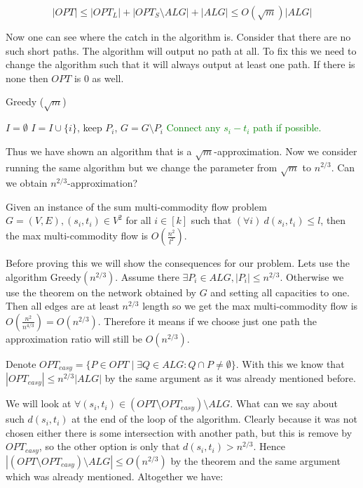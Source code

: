 $$
|OPT| \leq |OPT_{L}| + |OPT_{S} \setminus ALG| + |ALG| \leq O(\sqrt{m}) |ALG|
$$

Now one can see where the catch in the algorithm is. Consider that there are no such short paths. The algorithm will output no path at all. To fix this we need to change the algorithm such that it will always output at least one path. If there is none then $OPT$ is 0 as well.

\begin{algorithm}
	\caption{Greedy ($\sqrt{m}$)}
	\begin{algorithmic}[1]
		\State $I = \emptyset$
		\State $I = I \cup \{i\}$, keep $P_{i}$, $G = G \setminus P_{i}$
		\EndWhile
		\If{\textcolor{Green}{$I = \emptyset$}}
			\State \textcolor{Green}{Connect any $s_{i}-t_{i}$ path if possible.}
		\EndIf
	\end{algorithmic}
\end{algorithm}

Thus we have shown an algorithm that is a $\sqrt{m}$-approximation. Now we consider running the same algorithm but we change the parameter from $\sqrt{m}$ to $n^{2/3}$. Can we obtain $n^{2/3}$-approximation?

\begin{thm}
	\label{max flow bounded}
	Given an instance of the sum multi-commodity flow problem $G =(V,E), (s_{i}, t_{i}) \in V^2$ for all $i \in [k]$ such that $(\forall i) \ d(s_{i}, t_{i}) \leq l$, then the max multi-commodity flow is $O(\frac{n^2}{l^2})$.
\end{thm}

Before proving this we will show the consequences for our problem. Lets use the algorithm Greedy$(n^{2/3})$. Assume there $\exists P_{i} \in ALG, |P_{i}| \leq n^{2/3}$. Otherwise we use the theorem on the network obtained by $G$ and setting all capacities to one. Then all edges are at least $n^{2/3}$ length so we get the max multi-commodity flow is $O(\frac{n^{2}}{n^{4/3}}) = O(n^{2/3})$. Therefore it means if we choose just one path the approximation ratio will still be $O(n^{2/3})$.

Denote $OPT_{easy} = \{P \in OPT \mid \exists Q \in ALG : Q \cap P \neq \emptyset\}$. With this we know that $|OPT_{easy}| \leq n^{2/3} |ALG|$ by the same argument as it was already mentioned before.

We will look at $\forall (s_{i}, t_{i}) \in (OPT \setminus OPT_{easy}) \setminus ALG$. What can we say about such $d(s_{i}, t_{i})$ at the end of the loop of the algorithm. Clearly because it was not chosen either there is some intersection with another path, but this is remove by $OPT_{easy}$, so the other option is only that $d(s_{i}, t_{i}) > n^{2/3}$. Hence $|(OPT \setminus OPT_{easy}) \setminus ALG| \leq O(n^{2/3})$ by the theorem and the same argument which was already mentioned. Altogether we have:

